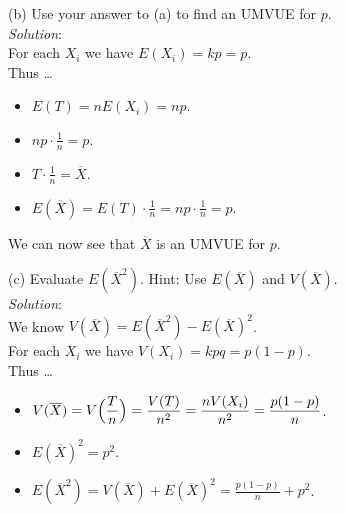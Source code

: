 \documentclass[12pt]{article}
\newcommand{\ds}{\displaystyle}
\begin{document}
(b) Use your answer to (a) to find an UMVUE for $ p $.
\vspace{2.5mm} \\
\textit{Solution}:
\vspace{2.5mm} \\

\noindent
For each $ X_{i} $ we have $ E( X_{i} ) = kp = p $. \\

Thus \dots

\begin{itemize}
    \item $ \ds E( T ) = n E( X_{i} ) = np $.
    \item $ \ds np \cdot \frac{1}{n} = p $.
    \item $ \ds T \cdot \frac{1}{n} = \overline{X} $.
    \item $ \ds E( \overline{X} ) = E ( T ) \cdot \frac{1}{n} = np \cdot \frac{1}{n} = p $.
\end{itemize}

\noindent
We can now see that $ \overline{X} $ is an UMVUE for $ p $. \\

\vspace{2.5mm}

\newpage
(c) Evaluate $ E(\overline{X}^{2}) $. Hint: Use $ E(\overline{X}) $ and $ V(\overline{X}) $.
\vspace{2.5mm} \\
\textit{Solution}:
\vspace{2.5mm} \\

\noindent
We know $ V(\overline{X}) = E(\overline{X}^{2}) - E(\overline{X})^{2} $. \\

\noindent
For each $ X_{i} $ we have $ V( X_{i} ) = kpq = p(1 - p) $. \\

Thus \dots

\begin{itemize}
    \item $ \ds V(\overline{X}) = V\Bigl( \frac{T}{n} \Bigr) = \frac{V( T )}{n^{2}} = \frac{nV( X_{i})}{n^{2}} = \frac{p(1-p)}{n} $.
    \item $ \ds E(\overline{X})^{2} = p^{2} $.
    \item $ \ds E(\overline{X}^{2}) = V(\overline{X}) + E(\overline{X})^{2} = \frac{p(1-p)}{n} + p^{2} $.
\end{itemize}
\vspace{2.5mm}
\end{document}
